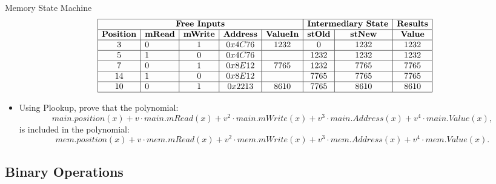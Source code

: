\begin{frame}{Memory State Machine}
\scriptsize
\[
\begin{array}{|c|l|c|c|c|c|c|c|c|}
\hline
\multicolumn{5}{|c|}{\textbf{Free Inputs}} & \multicolumn{2}{|c|}{\textbf{Intermediary State}} & \mathbf{Results} \\ \hline
\mathbf{Position} & \textbf{mRead} & \textbf{mWrite} & \mathbf{Address}  & \mathbf{ValueIn} & \mathbf{stOld} & \mathbf{stNew} & \mathbf{Value} \\ \hline
3 & 0 & 1 & 0x4C76 & 1232 & 0 & 1232 & 1232 \\ \hline
5 & 1 & 0 & 0x4C76 &  & 1232 & 1232 & 1232 \\ \hline
7 & 0 & 1 & 0x8E12 & 7765 & 1232 & 7765 & 7765 \\ \hline
14 & 1 & 0 & 0x8E12 &  & 7765 & 7765 & 7765 \\ \hline
10 & 0 & 1 & 0x2213 & 8610 & 7765 & 8610 & 8610 \\ \hline
\end{array}
\]
\small
\begin{itemize}
\item Using Plookup, prove that the polynomial:
\[
main.position(x) + v \cdot main.mRead(x) + v^2 \cdot main.mWrite(x) + v^3 \cdot main.Address(x) + v^4 \cdot main.Value(x),
\]
is included in the polynomial:
\[
mem.position(x) + v \cdot mem.mRead(x) + v^2 \cdot mem.mWrite(x) + v^3 \cdot mem.Address(x) + v^4 \cdot mem.Value(x).
\]
\end{itemize}
\end{frame}







\subsection{Binary Operations}

